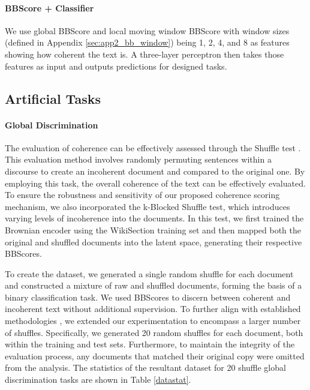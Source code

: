 \documentclass[letterpaper]{article}
\begin{document}
\paragraph{BBScore + Classifier}\label{bbclf} We use global BBScore and local moving window BBScore with window sizes (defined in Appendix \ref{sec:app2_bb_window}) being 1, 2, 4, and 8 as features showing how coherent the text is. A three-layer perceptron then takes those features as input and outputs predictions for designed tasks.

\subsection{Artificial Tasks}\label{exp:art}

\paragraph{Global Discrimination} The evaluation of coherence can be effectively assessed through the Shuffle test \citep{barzilay-lapata-2008-modeling, moon-etal-2019-unified}. This evaluation method involves randomly permuting sentences within a discourse to create an incoherent document and compared to the original one. By employing this task, the overall coherence of the text can be effectively evaluated. To ensure the robustness and sensitivity of our proposed coherence scoring mechanism, we also incorporated the k-Blocked Shuffle test, which introduces varying levels of incoherence into the documents. In this test, we first trained the Brownian encoder using the WikiSection training set and then mapped both the original and shuffled documents into the latent space, generating their respective BBScores.

To create the dataset, we generated a single random shuffle for each document and constructed a mixture of raw and shuffled documents, forming the basis of a binary classification task. We used BBScores to discern between coherent and incoherent text without additional supervision. To further align with established methodologies \citep{joty-etal-2018-coherence, moon-etal-2019-unified, jeon-strube-2022-entity}, we extended our experimentation to encompass a larger number of shuffles. Specifically, we generated 20 random shuffles for each document, both within the training and test sets. Furthermore, to maintain the integrity of the evaluation process, any documents that matched their original copy were omitted from the analysis. The statistics of the resultant dataset for 20 shuffle global discrimination tasks are shown in Table \ref{datastat}.
\end{document}

